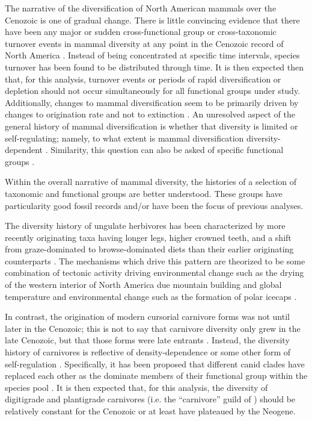 \documentclass[12pt,letterpaper]{article}
\begin{document}
The narrative of the diversification of North American mammals over the Cenozoic is one of gradual change. There is little convincing evidence that there have been any major or sudden cross-functional group or cross-taxonomic turnover events in mammal diversity at any point in the Cenozoic record of North America \citep{Alroy2009,Alroy1996a,Eronen2015,Janis1993b,Alroy2000g}. Instead of being concentrated at specific time intervals, species turnover has been found to be distributed through time. It is then expected then that, for this analysis, turnover events or periods of rapid diversification or depletion should not occur simultaneously for all functional groups under study. Additionally, changes to mammal diversification seem to be primarily driven by changes to origination rate and not to extinction \citep{Alroy1996a,Alroy2000g,Alroy2009}. An unresolved aspect of the general history of mammal diversification is whether that diversity is limited or self-regulating; namely, to what extent is mammal diversification diversity-dependent \citep{Alroy2009,Rabosky2015b,Harmon2015a,Rabosky2013a}. Similarity, this question can also be asked of specific functional groups \citep{Jernvall2004,Valkenburgh1999,Silvestro2015b,Quental2013}.

Within the overall narrative of mammal diversity, the histories of a selection of taxonomic and functional groups are better understood. These groups have particularity good fossil records and/or have been the focus of previous analyses.

The diversity history of ungulate herbivores has been characterized by more recently originating taxa having longer legs, higher crowned teeth, and a shift from graze-dominated to browse-dominated diets than their earlier originating counterparts \citep{Janis2004,Janis2000,Janis1993b,Janis2008a,Cantalapiedra2017,Fraser2015a}. The mechanisms which drive this pattern are theorized to be some combination of tectonic activity driving environmental change such as the drying of the western interior of North America due mountain building and global temperature and environmental change such as the formation of polar icecaps \citep{Janis2008a,Eronen2015,Blois2009,Badgley2017}. 

In contrast, the origination of modern cursorial carnivore forms was not until later in the Cenozoic; this is not to say that carnivore diversity only grew in the late Cenozoic, but that those forms were late entrants \citep{Janis1993c}. Instead, the diversity history of carnivores is reflective of density-dependence or some other form of self-regulation \citep{Valkenburgh1999,Silvestro2015b,Slater2015c}. Specifically, it has been proposed that different canid clades have replaced each other as the dominate members of their functional group within the species pool \citep{Silvestro2015b,Valkenburgh1999}. It is then expected that, for this analysis, the diversity of digitigrade and plantigrade carnivores (i.e. the ``carnivore'' guild of \citet{Valkenburgh1999}) should be relatively constant for the Cenozoic or at least have plateaued by the Neogene.
\end{document}
